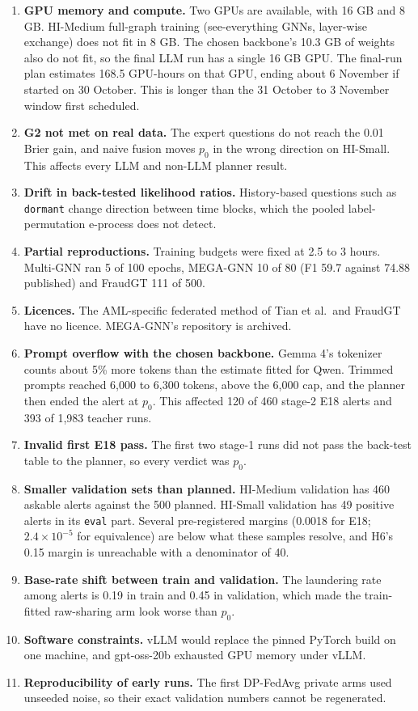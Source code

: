 \documentclass[11pt,a4paper]{article}
\begin{document}
\begin{enumerate}[label=C\arabic*.]
\item \textbf{GPU memory and compute.} Two GPUs are available, with 16 GB and 8 GB. HI-Medium full-graph training (see-everything GNNs, layer-wise exchange) does not fit in 8 GB. The chosen backbone's 10.3 GB of weights also do not fit, so the final LLM run has a single 16 GB GPU. The final-run plan estimates 168.5 GPU-hours on that GPU, ending about 6 November if started on 30 October. This is longer than the 31 October to 3 November window first scheduled.
\item \textbf{G2 not met on real data.} The expert questions do not reach the 0.01 Brier gain, and naive fusion moves $p_0$ in the wrong direction on HI-Small. This affects every LLM and non-LLM planner result.
\item \textbf{Drift in back-tested likelihood ratios.} History-based questions such as \texttt{dormant} change direction between time blocks, which the pooled label-permutation e-process does not detect.
\item \textbf{Partial reproductions.} Training budgets were fixed at 2.5 to 3 hours. Multi-GNN ran 5 of 100 epochs, MEGA-GNN 10 of 80 (F1 59.7 against 74.88 published) and FraudGT 111 of 500.
\item \textbf{Licences.} The AML-specific federated method of Tian et al.\ and FraudGT have no licence. MEGA-GNN's repository is archived.
\item \textbf{Prompt overflow with the chosen backbone.} Gemma 4's tokenizer counts about 5\% more tokens than the estimate fitted for Qwen. Trimmed prompts reached 6,000 to 6,300 tokens, above the 6,000 cap, and the planner then ended the alert at $p_0$. This affected 120 of 460 stage-2 E18 alerts and 393 of 1,983 teacher runs.
\item \textbf{Invalid first E18 pass.} The first two stage-1 runs did not pass the back-test table to the planner, so every verdict was $p_0$.
\item \textbf{Smaller validation sets than planned.} HI-Medium validation has 460 askable alerts against the 500 planned. HI-Small validation has 49 positive alerts in its \texttt{eval} part. Several pre-registered margins (0.0018 for E18; $2.4\times10^{-5}$ for equivalence) are below what these samples resolve, and H6's 0.15 margin is unreachable with a denominator of 40.
\item \textbf{Base-rate shift between train and validation.} The laundering rate among alerts is 0.19 in train and 0.45 in validation, which made the train-fitted raw-sharing arm look worse than $p_0$.
\item \textbf{Software constraints.} vLLM would replace the pinned PyTorch build on one machine, and gpt-oss-20b exhausted GPU memory under vLLM.
\item \textbf{Reproducibility of early runs.} The first DP-FedAvg private arms used unseeded noise, so their exact validation numbers cannot be regenerated.
\end{enumerate}
\end{document}

